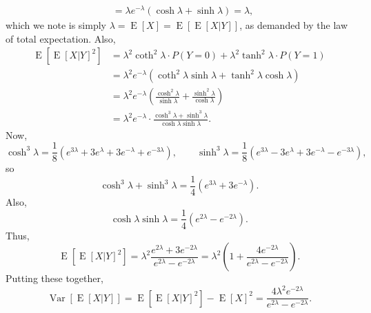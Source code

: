 \documentclass[10pt]{article}
\newcommand\op[1]{\operatorname{#1}}
\newcommand\E[1]{\op{E}[#1]}
\newcommand\V[1]{\op{Var}[#1]}
\begin{document}
\begin{enumerate}
\begin{align*}
                &= \lambda e^{-\lambda}\left(\cosh{\lambda} + 
                \sinh{\lambda}\right) = \lambda,
            \end{align*}
            which we note is simply $\lambda = \E{X} = \E{\E{X|Y}}$, as demanded by
            the law of total expectation. Also, \begin{align*}
                \E{\E{X|Y}^2} &= \lambda^2\coth^2{\lambda}\cdot P(Y = 0) +
                \lambda^2\tanh^2{\lambda}\cdot P(Y = 1) \\
                &= \lambda^2
                e^{-\lambda}\left(\coth^2{\lambda}\sinh{\lambda} +
                \tanh^2{\lambda}\cosh{\lambda}\right) \\
                &= \lambda^2
                e^{-\lambda}\left(\frac{\cosh^2\lambda}{\sinh\lambda} + 
                \frac{\sinh^2\lambda}{\cosh\lambda}\right) \\
                &= \lambda^2
                e^{-\lambda}\cdot\frac{\cosh^3\lambda +
                \sinh^3\lambda}{\cosh\lambda\sinh\lambda}.
            \end{align*}
            Now, \[
                \cosh^3\lambda = \frac{1}{8}(e^{3\lambda} + 3e^{\lambda} +
                3e^{-\lambda} + e^{-3\lambda}), \qquad
                \sinh^3\lambda = \frac{1}{8}(e^{3\lambda} - 3e^{\lambda} +
                3e^{-\lambda} - e^{-3\lambda}),
            \] so \[
                \cosh^3\lambda + \sinh^3\lambda = \frac{1}{4}(e^{3\lambda} +
                3e^{-\lambda}).
            \] Also, \[
                \cosh{\lambda}\sinh{\lambda} = \frac{1}{4}(e^{2\lambda} -
                e^{-2\lambda}).
            \] Thus, \[
                \E{\E{X|Y}^2} = \lambda^2 \frac{e^{2\lambda} +
                3e^{-2\lambda}}{e^{2\lambda} - e^{-2\lambda}} =
                \lambda^2\left(1 + \frac{4e^{-2\lambda}}{e^{2\lambda} -
                e^{-2\lambda}}\right).
            \] Putting these together, \[
                \V{\E{X|Y}} = \E{\E{X|Y}^2} - \E{X}^2 = \frac{4\lambda^2
                e^{-2\lambda}}{e^{2\lambda} - e^{-2\lambda}}.
            \]
        \end{enumerate}
        
\end{document}
